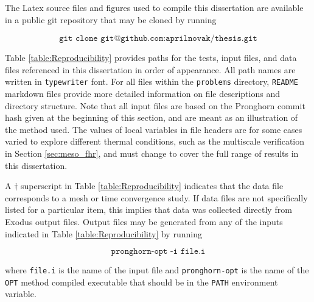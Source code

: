\begin{appendices}
The Latex source files and figures used to compile this dissertation are available in a public git repository that may be cloned by running

\begin{equation*}
\texttt{git clone git@github.com:aprilnovak/thesis.git}
\end{equation*}

\noindent Table \ref{table:Reproducibility} provides paths for the tests, input files, and data files referenced in this dissertation in order of appearance. All path names are written in \texttt{typewriter} font. For all files within the \texttt{problems} directory, \texttt{README} markdown files provide more detailed information on file descriptions and directory structure. Note that all input files are based on the Pronghorn commit hash given at the beginning of this section, and are meant as an illustration of the method used. The values of local variables in file headers are for some cases varied to explore different thermal conditions, such as the multiscale verification in Section \ref{sec:meso_fhr}, and must change to cover the full range of results in this dissertation.

A \(\dagger\) superscript in Table \ref{table:Reproducibility} indicates that the data file corresponds to a mesh or time convergence study. If data files are not specifically listed for a particular item, this implies that data was collected directly from Exodus output files. Output files may be generated from any of the inputs indicated in Table \ref{table:Reproducibility} by running

\begin{equation*}
\texttt{pronghorn-opt -i file.i}
\end{equation*}

\noindent where \texttt{file.i} is the name of the input file and \texttt{pronghorn-opt} is the name of the \texttt{OPT} method compiled executable that should be in the \texttt{PATH} environment variable.


\end{appendices}

